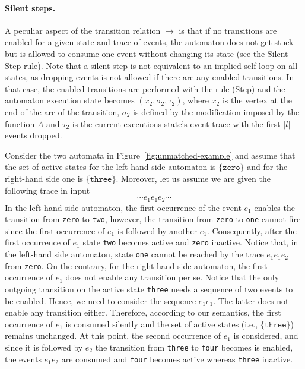 \documentclass{llncs} %
\begin{document}
\paragraph{Silent steps.}
A peculiar aspect of the transition relation $\to$ is that if no transitions are enabled for a given
state and trace of events, the automaton does not get stuck but is
allowed to consume one event without changing its state (see the  Silent Step rule). Note that
a silent step is not equivalent to an implied self-loop on all states, as
dropping events is not allowed if there are any enabled
transitions. In that case,  the enabled transitions are performed 
with the rule (Step) and
the automaton execution state becomes $(x_2, \sigma_2,\tau_2)$, where $x_2$ is the vertex at the
end of the arc of the transition, $\sigma_2$ is defined by the modification imposed by the function $A$ and
$\tau_2$ is the current executions state's event trace with the first
$|l|$ events dropped.
\begin{example}
Consider the two automata in Figure~\ref{fig:unmatched-example} and assume that the set of active states for the left-hand side automaton is $\{ \texttt{zero} \}$ and for the right-hand side one is $\{ \texttt{three}\}$. Moreover, let us assume we are given the following
trace in input
\[
\cdots e_1 e_1 e_2 \cdots
\] In the left-hand side automaton, the first occurrence of the event $e_1$ enables the transition  from {\tt zero} to {\tt two}, however, the transition from {\tt zero} to {\tt one} cannot fire since the first occurrence of $e_1$ is followed by another $e_1$.
Consequently, after the first occurrence of $e_1$ state {\tt two} becomes active and {\tt zero} inactive. 
Notice that, in the left-hand side automaton, state {\tt one} cannot be reached by 
the trace $e_1 e_1 e_2 $ from {\tt zero}. 
On the contrary, for the right-hand side automaton, the first occurrence of $e_1$ does not enable any transition per se. 
Notice that the only outgoing transition on the active state {\tt three} needs a sequence of two events to be enabled. Hence, we need to consider the sequence $e_1e_1$. The latter does not enable any transition either. Therefore, according to our semantics,  the first occurrence of $e_1$ is consumed silently and the set of active states (i.e., $\{ \texttt{three} \}$) remains unchanged. At this point, the second occurrence of $e_1$ is considered, and since it is followed by $e_2$ the transition from {\tt three} to {\tt four} becomes is enabled, the events $e_1e_2$ are consumed and {\tt four} becomes active whereas {\tt three} inactive.
\end{example}
\end{document}
